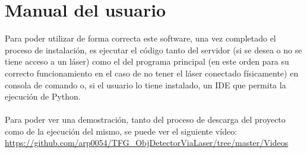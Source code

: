 \section{Manual del usuario}
Para poder utilizar de forma correcta este software, una vez completado el proceso de instalación, es ejecutar el código tanto del servidor (si se desea o no se tiene acceso a un láser) como el del programa principal (en este orden para su correcto funcionamiento en el caso de no tener el láser conectado físicamente) en consola de comando o, si el usuario lo tiene instalado, un IDE que permita la ejecución de Python.\\
\\
Para poder ver una demostración, tanto del proceso de descarga del proyecto como de la ejecución del mismo, se puede ver el siguiente vídeo: \url{https://github.com/arp0054/TFG_ObjDetectorViaLaser/tree/master/Videos}
